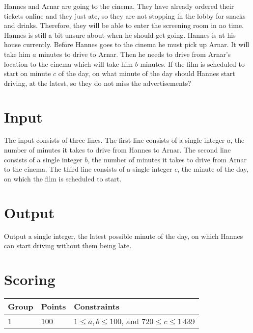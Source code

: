 
Hannes and Arnar are going to the cinema.
They have already ordered their tickets online and they just ate, so they are not stopping in the lobby for snacks and drinks.
Therefore, they will be able to enter the screening room in no time.
Hannes is still a bit unsure about when he should get going.
Hannes is at his house currently.
Before Hannes goes to the cinema he must pick up Arnar.
It will take him $a$ minutes to drive to Arnar.
Then he needs to drive from Arnar's location to the cinema which will take him $b$ minutes.
If the film is scheduled to start on minute $c$ of the day, on what minute of the day should Hannes start driving, at the latest, so they do not miss the advertisements?

\section*{Input}
The input consists of three lines.
The first line consists of a single integer $a$, the number of minutes it takes to drive from Hannes to Arnar.
The second line consists of a single integer $b$, the number of minutes it takes to drive from Arnar to the cinema.
The third line consists of a single integer $c$, the minute of the day, on which the film is scheduled to start.

\section*{Output}
Output a single integer, the latest possible minute of the day, on which Hannes can start driving without them being late.

\section*{Scoring}
\begin{tabular}{|l|l|l|}
\hline
Group & Points & Constraints \\ \hline
1     & 100    & $1 \leq a, b \leq 100$, and $720 \leq c \leq 1\,439$ \\ \hline
\end{tabular}
